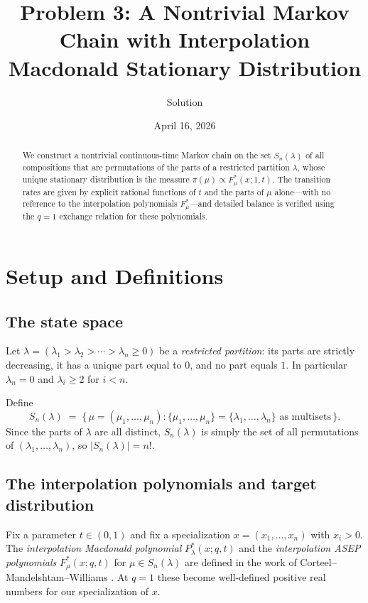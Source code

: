 \documentclass[12pt]{article}
\title{Problem 3: A Nontrivial Markov Chain with Interpolation Macdonald Stationary Distribution}
\author{Solution}
\date{April 16, 2026}
\begin{document}
\maketitle

\begin{abstract}
We construct a nontrivial continuous-time Markov chain on the set $S_n(\lambda)$ of all compositions that are permutations of the parts of a restricted partition $\lambda$, whose unique stationary distribution is the measure $\pi(\mu) \propto F^*_\mu(x;1,t)$. The transition rates are given by explicit rational functions of $t$ and the parts of $\mu$ alone---with no reference to the interpolation polynomials $F^*_\mu$---and detailed balance is verified using the $q=1$ exchange relation for these polynomials.
\end{abstract}

\section{Setup and Definitions}

\subsection{The state space}

Let $\lambda = (\lambda_1 > \lambda_2 > \cdots > \lambda_n \geq 0)$ be a \emph{restricted partition}: its parts are strictly decreasing, it has a unique part equal to $0$, and no part equals $1$. In particular $\lambda_n = 0$ and $\lambda_i \geq 2$ for $i < n$.

Define
\[
S_n(\lambda) \;=\; \bigl\{\,\mu = (\mu_1,\dots,\mu_n) : \{\mu_1,\dots,\mu_n\} = \{\lambda_1,\dots,\lambda_n\} \text{ as multisets}\,\bigr\}.
\]
Since the parts of $\lambda$ are all distinct, $S_n(\lambda)$ is simply the set of all permutations of $(\lambda_1,\dots,\lambda_n)$, so $|S_n(\lambda)| = n!$.

\subsection{The interpolation polynomials and target distribution}

Fix a parameter $t \in (0,1)$ and fix a specialization $x = (x_1,\dots,x_n)$ with $x_i > 0$. The \emph{interpolation Macdonald polynomial} $P^*_\lambda(x;q,t)$ and the \emph{interpolation ASEP polynomials} $F^*_\mu(x;q,t)$ for $\mu \in S_n(\lambda)$ are defined in the work of Corteel--Mandelshtam--Williams \cite{CMW}. At $q=1$ these become well-defined positive real numbers for our specialization of $x$.
\end{document}
